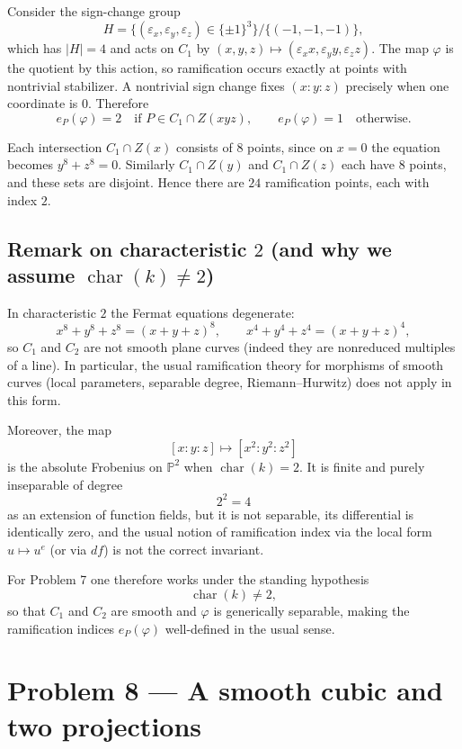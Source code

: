 \documentclass[12pt,a4paper]{article}
\theoremstyle{plain}
\theoremstyle{definition}      %
\begin{document}
Consider the sign-change group
\[
H=\{(\varepsilon_x,\varepsilon_y,\varepsilon_z)\in\{\pm 1\}^3\}/\{(-1,-1,-1)\},
\]
which has \(|H|=4\) and acts on \(C_1\) by \((x,y,z)\mapsto (\varepsilon_x x,\varepsilon_y y,\varepsilon_z z)\).
The map \(\varphi\) is the quotient by this action, so ramification occurs exactly at points with nontrivial stabilizer.
A nontrivial sign change fixes \((x:y:z)\) precisely when one coordinate is \(0\).
Therefore
\[
e_P(\varphi)=2
\quad\text{if }P\in C_1\cap Z(xyz),
\qquad
e_P(\varphi)=1
\quad\text{otherwise.}
\]

Each intersection \(C_1\cap Z(x)\) consists of \(8\) points, since on \(x=0\) the equation becomes \(y^8+z^8=0\).
Similarly \(C_1\cap Z(y)\) and \(C_1\cap Z(z)\) each have \(8\) points, and these sets are disjoint.
Hence there are \(24\) ramification points, each with index \(2\).


\subsection*{Remark on characteristic \(2\) (and why we assume \(\operatorname{char}(k)\neq 2\))}

In characteristic \(2\) the Fermat equations degenerate:
\[
x^8+y^8+z^8=(x+y+z)^8,
\qquad
x^4+y^4+z^4=(x+y+z)^4,
\]
so \(C_1\) and \(C_2\) are not smooth plane curves (indeed they are nonreduced multiples of a line).
In particular, the usual ramification theory for morphisms of smooth curves (local parameters, separable degree, Riemann--Hurwitz) does not apply in this form.

Moreover, the map
\[
[x:y:z]\longmapsto [x^2:y^2:z^2]
\]
is the absolute Frobenius on \(\mathbb P^2\) when \(\operatorname{char}(k)=2\).
It is finite and purely inseparable of degree
\[
2^2=4
\]
as an extension of function fields, but it is not separable, its differential is identically zero, and the usual notion of ramification index via the local form \(u\mapsto u^{e}\) (or via \(df\)) is not the correct invariant.

For Problem 7 one therefore works under the standing hypothesis
\[
\operatorname{char}(k)\neq 2,
\]
so that \(C_1\) and \(C_2\) are smooth and \(\varphi\) is generically separable, making the ramification indices \(e_P(\varphi)\) well-defined in the usual sense.


\section*{Problem 8 — A smooth cubic and two projections}
\end{document}
